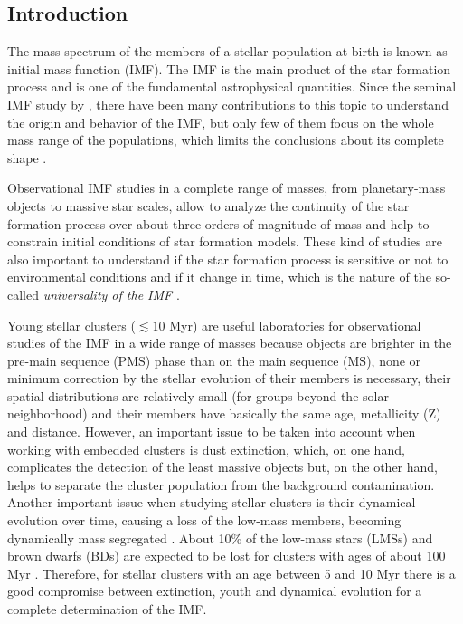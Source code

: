 \documentclass[12pt]{article}
\begin{document}
\subsection{Introduction}
\label{sec_IMF:introduction}

The mass spectrum of the members of a stellar population at birth is known as initial mass function (IMF). The IMF is the main product of the star formation process and is one of the fundamental astrophysical quantities. Since the seminal IMF study by \citet{Salpeter1955}, there have been many contributions to this topic to understand the origin and behavior of the IMF, but only few of them focus on the whole mass range of the populations, which limits the conclusions about its complete shape \cite[e.g.][and references therein]{Bastian2010}.

Observational IMF studies in a complete range of masses, from planetary-mass objects to massive star scales, allow to analyze the continuity of the star formation process over about three orders of magnitude of mass and help to constrain initial conditions of star formation models. These kind of studies are also important to understand if the star formation process is sensitive or not to environmental conditions and if it change in time, which is the nature of the so-called \textit{universality of the IMF} \cite[e.g.][]{Kroupa2013,Offner2014}.

Young stellar clusters ($\lesssim 10$ Myr) are useful laboratories for observational studies of the IMF in a wide range of masses because objects are brighter in the pre-main sequence (\ac{PMS}) phase than on the main sequence (\ac{MS}), none or minimum correction by the stellar evolution of their members is necessary, their spatial distributions are relatively small (for groups beyond the solar neighborhood) and their members have basically the same age, metallicity (\ac{Z}) and distance. However, an important issue to be taken into account when working with embedded clusters \citep[$\lesssim3$ Myr; ][]{Lada-Lada2003} is dust extinction, which, on one hand, complicates the detection of the least massive objects but, on the other hand, helps to separate the cluster population from the background contamination. Another important issue when studying stellar clusters is their dynamical evolution over time, causing a loss of the low-mass members, becoming dynamically mass segregated \citep[e.g., ][]{Elmegreen2000}. About 10\% of the low-mass stars (LMSs) and brown dwarfs (BDs) are expected to be lost for clusters with ages of about 100 Myr \citep{deLaFuenteMarcos-deLaFuenteMarcos2000}. Therefore, for stellar clusters with an age between 5 and 10 Myr there is a good compromise between extinction, youth and dynamical evolution for a complete determination of the IMF.
\end{document}

